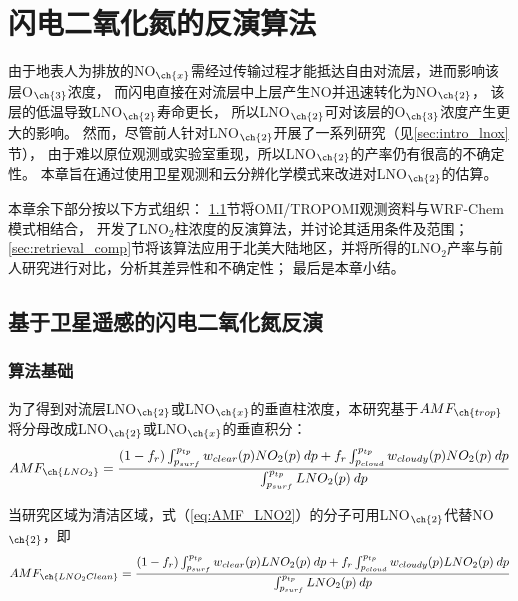 
\chapter{闪电二氧化氮的反演算法} \label{chapter:retrieval}

由于地表人为排放的NO$_{\ch{x}}$需经过传输过程才能抵达自由对流层，进而影响该层O$_{\ch{3}}$浓度，
而闪电直接在对流层中上层产生NO并迅速转化为NO$_{\ch{2}}$，
该层的低温导致LNO$_{\ch{2}}$寿命更长，
所以LNO$_{\ch{2}}$可对该层的O$_{\ch{3}}$浓度产生更大的影响。
然而，尽管前人针对LNO$_{\ch{2}}$开展了一系列研究（见\ref{sec:intro_lnox}节），
由于难以原位观测或实验室重现，所以LNO$_{\ch{2}}$的产率仍有很高的不确定性。
本章旨在通过使用卫星观测和云分辨化学模式来改进对LNO$_{\ch{2}}$的估算。

本章余下部分按以下方式组织：
\ref{sec:retrieval_method}节将OMI/TROPOMI观测资料与WRF-Chem模式相结合，
开发了LNO$_2$柱浓度的反演算法，并讨论其适用条件及范围；
\ref{sec:retrieval_comp}节将该算法应用于北美大陆地区，并将所得的LNO$_2$产率与前人研究进行对比，分析其差异性和不确定性；
最后是本章小结。

\section{基于卫星遥感的闪电二氧化氮反演} \label{sec:retrieval_method}

\subsection{算法基础} \label{sec:amf_definition}

为了得到对流层LNO$_{\ch{2}}$或LNO$_{\ch{x}}$的垂直柱浓度，本研究基于$AMF_{\ch{trop}}$将分母改成LNO$_{\ch{2}}$或LNO$_{\ch{x}}$的垂直积分：
\begin{equation} \label{eq:AMF_LNO2}
AMF_{\ch{LNO_2}} = \frac{(1-f_r) \int_{p_{surf}}^{p_{tp}} w_{clear}(p) NO_2(p) \: dp + f_r \int_{p_{cloud}}^{p_{tp}} w_{cloudy}(p) NO_2(p) \: dp}{\int_{p_{surf}}^{p_{tp}} LNO_2(p) \: dp}
\end{equation}

当研究区域为清洁区域，式（\ref{eq:AMF_LNO2}）的分子可用LNO$_{\ch{2}}$代替NO$_{\ch{2}}$，即
\begin{equation} \label{eq:AMF_LNO2clean}
AMF_{\ch{LNO_2Clean}} = \frac{(1-f_r) \int_{p_{surf}}^{p_{tp}} w_{clear}(p) LNO_2(p) \: dp + f_r \int_{p_{cloud}}^{p_{tp}} w_{cloudy}(p) LNO_2(p) \: dp}{\int_{p_{surf}}^{p_{tp}} LNO_2(p) \: dp}
\end{equation}


